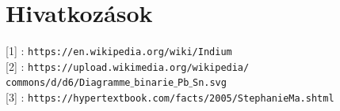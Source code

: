 \documentclass[12pt,a4paper]{article}
\begin{document}
\section*{Hivatkozások}
\hspace*{14pt} [1] : \texttt{https://en.wikipedia.org/wiki/Indium}\\
\hspace*{14pt} [2] : \texttt{https://upload.wikimedia.org/wikipedia/\\ \hspace*{84pt} commons/d/d6/Diagramme$\_$binarie$\_$Pb$\_$Sn.svg}\\
\hspace*{14pt} [3] : \texttt{https://hypertextbook.com/facts/2005/StephanieMa.shtml}
\end{document}
